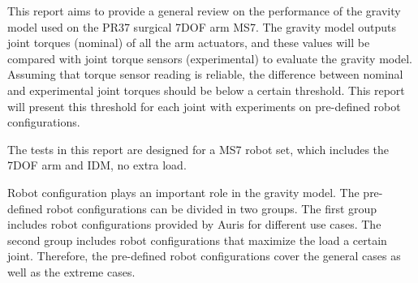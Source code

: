 This report aims to provide a general review on the performance of the gravity model used on the PR37 surgical 7DOF arm MS7. The gravity model outputs joint torques (nominal) of all the arm actuators, and these values will be compared with joint torque sensors (experimental) to evaluate the gravity model. Assuming that torque sensor reading is reliable, the difference between nominal and experimental joint torques should be below a certain threshold. This report will present this threshold for each joint with experiments on pre-defined robot configurations. 

The tests in this report are designed for a MS7 robot set, which includes the 7DOF arm and IDM, no extra load. 

Robot configuration plays an important role in the gravity model. The pre-defined robot configurations can be divided in two groups. The first group includes robot configurations provided by Auris for different use cases. The second group includes robot configurations that maximize the load a certain joint. Therefore, the pre-defined robot configurations cover the general cases as well as the extreme cases. 

